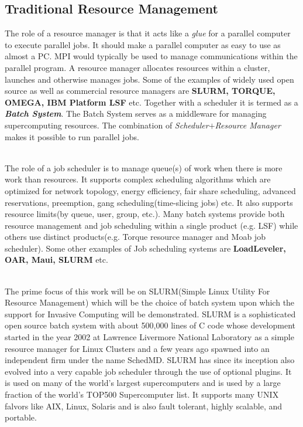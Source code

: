 \documentclass[a4paper, 12pt]{article}
\begin{document}
\subsection{Traditional Resource Management}
The role of a resource manager is that it acts like a \textit{glue} for a parallel computer to execute parallel jobs. It should make a parallel computer as easy to use as almost a PC. MPI would typically be used to manage communications within the parallel program. A resource manager allocates resources within a cluster, launches and otherwise manages jobs. Some of the examples of widely used open source as well as commercial resource managers are \textbf{SLURM, TORQUE, OMEGA, IBM Platform LSF} etc. Together with a scheduler it is termed as a \textbf{\textit{Batch System}}. The Batch System serves as a middleware for managing supercomputing resources. The combination of \textit{Scheduler}$+$\textit{Resource Manager} makes it possible to run parallel jobs.\par
\noindent
\\
The role of a job scheduler is to manage queue(s) of work when there is more work than resources. It supports complex scheduling algorithms which are optimized for network topology, energy efficiency, fair share scheduling, advanced reservations, preemption, gang scheduling(time-slicing jobs) etc. It also supports resource limits(by queue, user, group, etc.). Many batch systems provide both resource management and job scheduling within a single product (e.g. LSF) while others use distinct products(e.g. Torque resource manager and Moab job scheduler). Some other examples of Job scheduling systems are \textbf{LoadLeveler, OAR, Maui, SLURM} etc.\par
\noindent
\\
The prime focus of this work will be on SLURM(Simple Linux Utility For Resource Management) which will be the choice of batch system upon which the support for Invasive Computing will be demonstrated. SLURM is a sophisticated open source batch system with about 500,000 lines of C code whose development started in the year 2002 at Lawrence Livermore National Laboratory as a simple resource manager for Linux Clusters and a few years ago spawned into an independent firm under the name SchedMD. SLURM has since its inception also evolved into a very capable job scheduler through the use of optional plugins. It is used on many of the world's largest supercomputers and is used by a large fraction of the world's TOP500 Supercomputer list. It supports many UNIX falvors like AIX, Linux, Solaris and is also fault tolerant, highly scalable, and portable.\par
\end{document}
